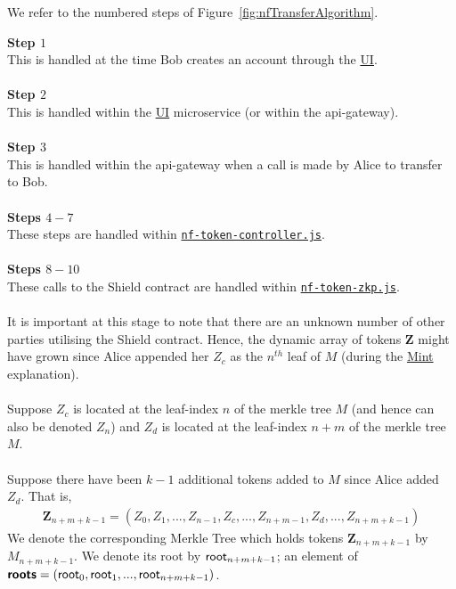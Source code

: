 We refer to the numbered steps of Figure~\ref{fig:nfTransferAlgorithm}.

\textbf{Step $1$}
\ \\
This is handled at the time Bob creates an account through the \hyperref[sec:ui]{UI}.\\
\\

\textbf{Step $2$}
\ \\
This is handled within the \hyperref[sec:ui]{UI} microservice (or within the api-gateway).\\
\\

\textbf{Step $3$}
\ \\
This is handled within the api-gateway when a call is made by Alice to transfer to Bob.\\
\\

\textbf{Steps $4 - 7$}
\ \\
These steps are handled within \hyperref[sec:nf-token-controller]{\texttt{nf-token-controller.js}}.\\
\\

\textbf{Steps $8 - 10$}
\ \\
These calls to the Shield contract are handled within \hyperref[sec:nf-token-zkp]{\texttt{nf-token-zkp.js}}.\\
\\
It is important at this stage to note that there are an unknown number of other parties utilising the Shield contract.
Hence, the dynamic array of tokens $\bm{Z}$ might have grown since Alice appended her $Z_c$ as the $n^{th}$ leaf of $M$ (during the \hyperref[sec:20Mint]{Mint} explanation).\\
\\
Suppose $Z_c$ is located at the leaf-index $n$ of the merkle tree $M$ (and hence can also be denoted $Z_n$) and $Z_d$ is located at the leaf-index $n+m$ of the merkle tree $M$.\\
\\
Suppose there have been $k-1$ additional tokens added to $M$ since Alice added $Z_d$.
That is,\\
\begin{align*}
  \bm{Z}_{n+m+k-1} = (Z_0, Z_1,...,Z_{n-1}, Z_c, ..., Z_{n+m-1}, Z_d,..., Z_{n+m+k-1})
\end{align*}
We denote the corresponding Merkle Tree which holds tokens $\bm{Z}_{n+m+k-1}$ by $M_{n+m+k-1}$.
We denote its root by $\mathsf{root}_{n+m+k-1}$; an element of $\bm{\mathsf{roots}} = (\mathsf{root}_0, \mathsf{root}_1,...,\mathsf{root}_{n+m+k-1})$.\\
\\


